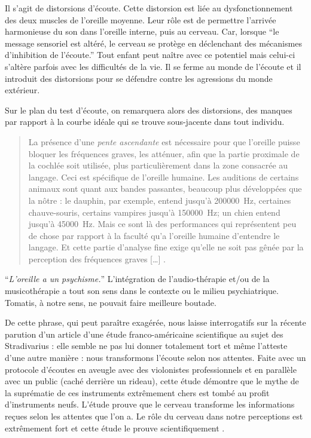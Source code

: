 Il s'agit de distorsions d'écoute. Cette distorsion est liée au dysfonctionnement
des deux muscles de l'oreille moyenne. Leur rôle est de permettre l'arrivée
harmonieuse du son dans l'oreille interne, puis au cerveau. Car, lorsque
\enquote{le message sensoriel est altéré, le cerveau se protège en déclenchant
des mécanismes d'inhibition de l'écoute.} Tout enfant peut naître
avec ce potentiel mais celui-ci s'altère parfois avec les difficultés
de la vie. Il se ferme au monde de l'écoute et il introduit des distorsions
pour se défendre contre les agressions du monde extérieur. 

Sur le plan du test d'écoute, on remarquera
alors des distorsions, des manques par rapport à la courbe
idéale qui se trouve sous-jacente dans tout individu. 

\blockquote{La présence d'une \emph{pente ascendante} est nécessaire pour que
l'oreille puisse bloquer les fréquences graves, les atténuer, afin
que la partie proximale de la cochlée soit utilisée, plus particulièrement
dans la zone consacrée au langage. Ceci est spécifique de l'oreille
humaine. Les auditions de certains animaux sont quant aux bandes passantes,
beaucoup plus développées que la nôtre : le dauphin, par exemple,
entend jusqu'à \SI{200000}{\Hz}, certaines chauve-souris,
certains vampires jusqu'à \SI{150000}{\Hz}; un chien entend jusqu'à \SI{45000}{\Hz}. Mais ce sont là des performances qui représentent peu de chose
par rapport à la faculté qu'a l'oreille humaine d'entendre
le langage. Et cette partie d'analyse fine exige qu'elle ne soit pas
gênée par la perception des fréquences graves [\dots] \autocite{Entretien de Tomatis par Auriol}. }

\enquote{\emph{L'oreille a un psychisme\autocite[correct? p.?]{tomatis:loreille}.}} 
L'intégration de l'audio-thérapie et/ou de la musicothérapie a tout son sens dans le contexte ou le milieu psychiatrique. Tomatis, à notre sens, ne pouvait faire meilleure boutade.

De cette phrase, qui peut paraître exagérée,
nous laisse interrogatifs sur la récente parution d'un
article d'une étude franco-américaine scientifique
\autocite{fritz_stradivarius} au sujet des Stradivarius : elle semble ne pas lui donner totalement
tort et même l'atteste d'une autre manière : nous transformons l'écoute
selon nos attentes. Faite avec un protocole d'écoutes en aveugle avec
des violonistes professionnels et en parallèle avec un public (caché
derrière un rideau), cette étude démontre que le mythe de la suprématie
de ces instruments extrêmement chers est tombé au profit d'instruments
neufs. L'étude prouve que le cerveau transforme les informations reçues
selon les attentes que l'on a. Le rôle du cerveau dans notre perceptions
est extrêmement fort et cette étude le prouve scientifiquement
\autocite{lemonde.fr:stradivarius}.

